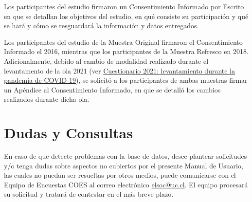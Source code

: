 \documentclass[
  12pt,
]{article}
\begin{document}
Los participantes del estudio firmaron un Consentimiento Informado por Escrito en que se detallan los objetivos del estudio, en qué consiste su participación y qué se hará y cómo se resguardará la información y datos entregados.

Los participantes del estudio de la Muestra Original firmaron el Consentimiento Informado el 2016, mientras que los participantes de la Muestra Refresco en 2018. Adicionalmente, debido al cambio de modalidad realizado durante el levantamento de la ola 2021 (ver \protect\hyperlink{instrumento-covid}{Cuestionario 2021: levantamiento durante la pandemia de COVID-19}), se solicitó a los participantes de ambas muestras firmar un Apéndice al Consentimiento Informado, en que se detalló los cambios realizados durante dicha ola.

\newpage

\hypertarget{dudas-y-consultas}{%
\section{Dudas y Consultas}\label{dudas-y-consultas}}

En caso de que detecte problemas con la base de datos, desee plantear solicitudes y/o tenga dudas sobre aspectos no cubiertos por el presente Manual de Usuario, las cuales no puedan ser resueltas por otros medios, puede comunicarse con el Equipo de Encuestas COES al correo electrónico \url{elsoc@uc.cl}. El equipo procesará su solicitud y tratará de contestar en el más breve plazo.

\newpage
\end{document}
